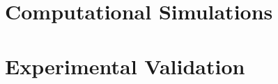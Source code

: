 \lipsum[1-3]

\section{Computational Simulations}



\lipsum[1-6]

\section{Experimental Validation}


\lipsum[1-6]


%
%
%
%
%
%
%
